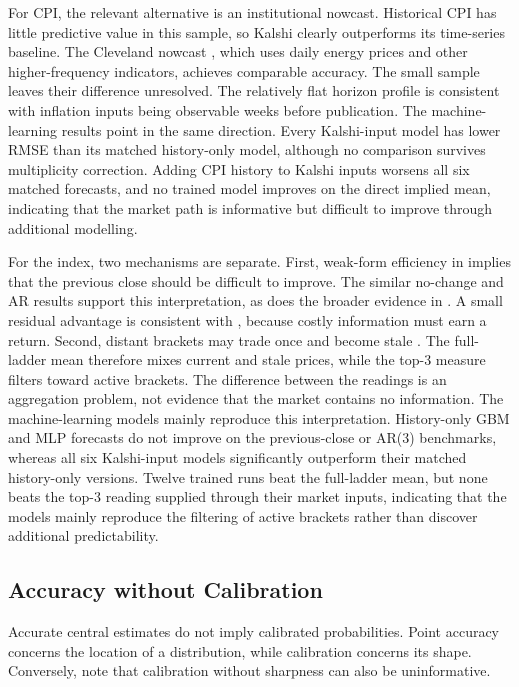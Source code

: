 \documentclass[12pt,a4paper]{report}
\begin{document}
For CPI, the relevant alternative is an institutional nowcast. Historical CPI
has little predictive value in this sample, so Kalshi clearly outperforms its
time-series baseline. The Cleveland nowcast \parencite{knotek2017}, which uses
daily energy prices and other higher-frequency indicators, achieves comparable
accuracy. The small sample leaves their difference unresolved. The relatively
flat horizon profile is consistent with inflation inputs being observable
weeks before publication. The machine-learning results point in the same direction. Every Kalshi-input model has lower RMSE than its matched history-only model, although no comparison survives multiplicity correction. Adding CPI history to Kalshi inputs worsens all six matched forecasts, and no trained model improves on the direct implied mean, indicating that the market path is informative but difficult to improve through additional modelling. 

For the index, two mechanisms are separate. First, weak-form efficiency in
\textcite{fama1970} implies that the previous close should be difficult to
improve. The similar no-change and AR results support this interpretation, as
does the broader evidence in \textcite{welch2008}. A small residual advantage
is consistent with \textcite{grossman1980}, because costly information must
earn a return. Second, distant brackets may trade once and become stale
\parencite{greene2026}. The full-ladder mean therefore mixes current and stale
prices, while the top-3 measure filters toward active brackets. The difference
between the readings is an aggregation problem, not evidence that the market
contains no information. The machine-learning models mainly reproduce this interpretation. History-only GBM and MLP forecasts do not improve on the previous-close or AR(3) benchmarks, whereas all six Kalshi-input models significantly outperform their matched history-only versions. Twelve trained runs beat the full-ladder mean, but none beats the top-3 reading supplied through their market inputs, indicating that the models mainly reproduce the filtering of active brackets rather than discover additional predictability.

\subsection{Accuracy without Calibration}

Accurate central estimates do not imply calibrated probabilities. Point
accuracy concerns the location of a distribution, while calibration concerns
its shape. Conversely, \textcite{gneiting2007} note that calibration without
sharpness can also be uninformative.
\end{document}
